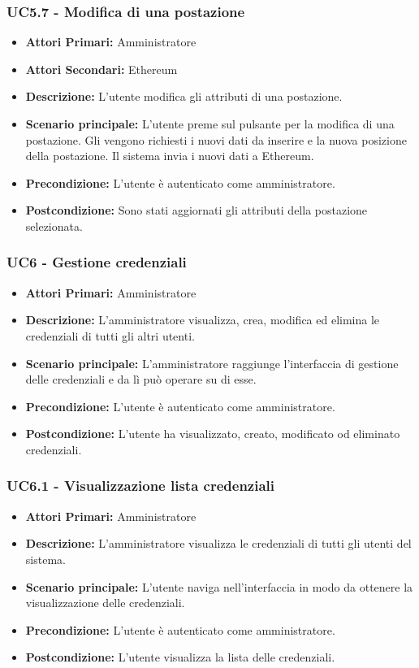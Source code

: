 \subsubsection{ UC5.7 - Modifica di una postazione}
\begin{itemize}
	\item\textbf{Attori Primari:}
	Amministratore 
	\item\textbf{Attori Secondari:}
	Ethereum
	\item\textbf{Descrizione:}
	L'utente modifica gli attributi di una postazione.
	\item\textbf{Scenario principale:} 
	L'utente preme sul pulsante per la modifica di una postazione. Gli vengono richiesti i nuovi dati da inserire e la nuova posizione della postazione. Il sistema invia i nuovi dati a Ethereum.
	\item\textbf{Precondizione:} 
	L'utente è autenticato come amministratore.
	\item\textbf{Postcondizione:}
	Sono stati aggiornati gli attributi della postazione selezionata.
\end{itemize}

\subsubsection{ UC6 - Gestione credenziali}
\begin{itemize}
           	\item\textbf{Attori Primari:} 
           	Amministratore
           	\item\textbf{Descrizione:} 
           	L'amministratore visualizza, crea, modifica ed elimina le credenziali di tutti gli altri utenti.
           	\item\textbf{Scenario principale:} 
           	L'amministratore raggiunge l'interfaccia di gestione delle credenziali e da lì può operare su di esse.
           	\item\textbf{Precondizione:} 
           	L'utente è autenticato come amministratore.
           	\item\textbf{Postcondizione:}
           	L'utente ha visualizzato, creato, modificato od eliminato credenziali.
\end{itemize}

\subsubsection{ UC6.1 - Visualizzazione lista credenziali}
\begin{itemize}
	\item\textbf{Attori Primari:} 
	Amministratore
	\item\textbf{Descrizione:} 
	L'amministratore visualizza le credenziali di tutti gli utenti del sistema.
	\item\textbf{Scenario principale:} 
	L'utente naviga nell'interfaccia in modo da ottenere la visualizzazione delle credenziali.
	\item\textbf{Precondizione:} 
	L'utente è autenticato come amministratore.
	\item\textbf{Postcondizione:}
	L'utente visualizza la lista delle credenziali.
\end{itemize}

